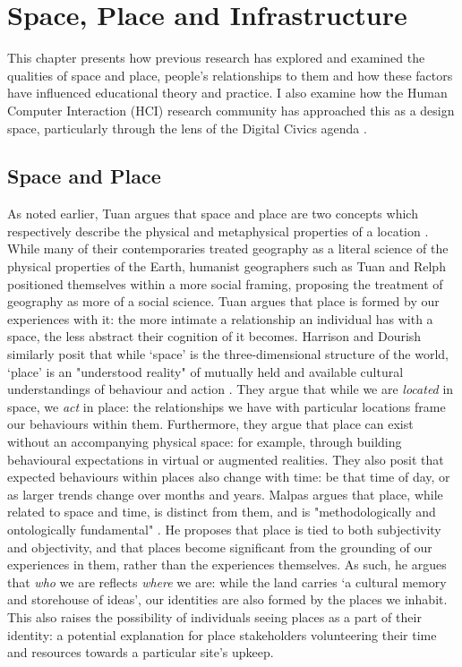 \chapter{Space, Place and Infrastructure}
\label{chap:SpacePlaceInfrastructure}

This chapter presents how previous research has explored and examined the qualities of space and place, people's relationships to them and how these factors have influenced educational theory and practice. I also examine how the Human Computer Interaction (HCI) research community has approached this as a design space, particularly through the lens of the Digital Civics agenda \citep{Olivier2015}.

\section{Space and Place}
\label{sec:SpaceAndPlace}

As noted earlier, Tuan argues that space and place are two concepts which respectively describe the physical and metaphysical properties of a location \citep{Tuan1978}. While many of their contemporaries treated geography as a literal science of the physical properties of the Earth, humanist geographers such as Tuan and Relph \citep{Relph1976} positioned themselves within a more social framing, proposing the treatment of geography as more of a social science. Tuan argues that place is formed by our experiences with it: the more intimate a relationship an individual has with a space, the less abstract their cognition of it becomes. Harrison and Dourish similarly posit that while `space' is the three-dimensional structure of the world, `place' is an "understood reality" of mutually held and available cultural understandings of behaviour and action \citep{harrison1996}. They argue that while we are \textit{located} in space, we \textit{act} in place: the relationships we have with particular locations frame our behaviours within them. Furthermore, they argue that place can exist without an accompanying physical space: for example, through building behavioural expectations in virtual or augmented realities. They also posit that expected behaviours within places also change with time: be that time of day, or as larger trends change over months and years. Malpas argues that place, while related to space and time, is distinct from them, and is "methodologically and ontologically fundamental" \citep{malpas1999}. He proposes that place is tied to both subjectivity and objectivity, and that places become significant from the grounding of our experiences in them, rather than the experiences themselves. As such, he argues that \textit{who} we are reflects \textit{where} we are: while the land carries `a cultural memory and storehouse of ideas', our identities are also formed by the places we inhabit. This also raises the possibility of individuals seeing places as a part of their identity: a potential explanation for place stakeholders volunteering their time and resources towards a particular site's upkeep.

